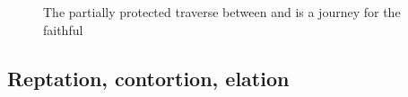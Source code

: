 \begin{figure}[t!]
\checkoddpage \ifoddpage \forcerectofloat \else \forceversofloat \fi
\centering
{}
\caption{The partially protected traverse between  and  is a journey for the faithful }
\label{traverse}
\end{figure}

\subsection{Reptation, contortion, elation}


\begin{survey}[t!]
\checkoddpage \ifoddpage \forcerectofloat \else \forceversofloat \fi
{}
\caption[Cloaca Maxima]{\protect{} (grade 1) } \label{survey:cloaca_maxima_grade1}
\end{survey}


